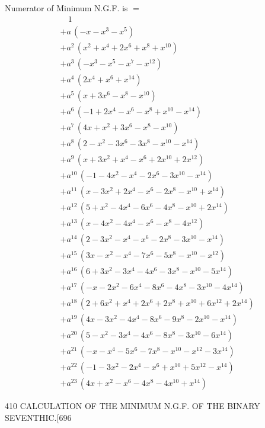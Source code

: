 \documentclass[11pt]{article}
\begin{document}
\smallskip
\noindent Numerator of Minimum N.G.F. is $=$
{\small
\begin{align*}
&\phantom{+\,} 1\\
&+ a\,(-x - x^{3} - x^{5})\\
&+ a^{2}\,(x^{2} + x^{4} + 2x^{6} + x^{8} + x^{10})\\
&+ a^{3}\,(-x^{3} - x^{5} - x^{7} - x^{12})\\
&+ a^{4}\,(2x^{4} + x^{6} + x^{14})\\
&+ a^{5}\,(x + 3x^{6} - x^{8} - x^{10})\\
&+ a^{6}\,(-1 + 2x^{4} - x^{6} - x^{8} + x^{10} - x^{14})\\
&+ a^{7}\,(4x + x^{2} + 3x^{6} - x^{8} - x^{10})\\
&+ a^{8}\,(2 - x^{2} - 3x^{6} - 3x^{8} - x^{10} - x^{14})\\
&+ a^{9}\,(x + 3x^{2} + x^{4} - x^{6} + 2x^{10} + 2x^{12})\\
&+ a^{10}\,(-1 - 4x^{2} - x^{4} - 2x^{6} - 3x^{10} - x^{14})\\
&+ a^{11}\,(x - 3x^{2} + 2x^{4} - x^{6} - 2x^{8} - x^{10} + x^{14})\\
&+ a^{12}\,(5 + x^{2} - 4x^{4} - 6x^{6} - 4x^{8} - x^{10} + 2x^{14})\\
&+ a^{13}\,(x - 4x^{2} - 4x^{4} - x^{6} - x^{8} - 4x^{12})\\
&+ a^{14}\,(2 - 3x^{2} - x^{4} - x^{6} - 2x^{8} - 3x^{10} - x^{14})\\
&+ a^{15}\,(3x - x^{2} - x^{4} - 7x^{6} - 5x^{8} - x^{10} - x^{12})\\
&+ a^{16}\,(6 + 3x^{2} - 3x^{4} - 4x^{6} - 3x^{8} - x^{10} - 5x^{14})\\
&+ a^{17}\,(-x - 2x^{2} - 6x^{4} - 8x^{6} - 4x^{8} - 3x^{10} - 4x^{14})\\
&+ a^{18}\,(2 + 6x^{2} + x^{4} + 2x^{6} + 2x^{8} + x^{10} + 6x^{12} + 2x^{14})\\
&+ a^{19}\,(4x - 3x^{2} - 4x^{4} - 8x^{6} - 9x^{8} - 2x^{10} - x^{14})\\
&+ a^{20}\,(5 - x^{2} - 3x^{4} - 4x^{6} - 8x^{8} - 3x^{10} - 6x^{14})\\
&+ a^{21}\,(-x - x^{4} - 5x^{6} - 7x^{8} - x^{10} - x^{12} - 3x^{14})\\
&+ a^{22}\,(-1 - 3x^{2} - 2x^{4} - x^{6} + x^{10} + 5x^{12} - x^{14})\\
&+ a^{23}\,(4x + x^{2} - x^{6} - 4x^{8} - 4x^{10} + x^{14})
\end{align*}
}

\clearpage
\begin{center}\small 410 \hfill CALCULATION OF THE MINIMUM N.G.F. OF THE BINARY SEVENTHIC.\hfill [696\end{center}
\end{document}
